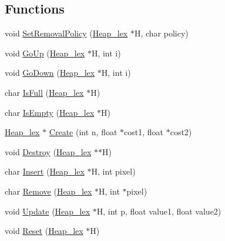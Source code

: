 \subsection*{Functions}
\begin{DoxyCompactItemize}
\item 
void \hyperlink{namespacegft_1_1Heap__lex_aae153f96da542040d4fdeef74b900c6b}{Set\-Removal\-Policy} (\hyperlink{namespacegft_1_1Heap__lex_ad75bb201b66a6623842b22d41ae1d473}{Heap\-\_\-lex} $\ast$H, char policy)
\item 
void \hyperlink{namespacegft_1_1Heap__lex_ad2299cff8030bb7a56ffa03d853bc97a}{Go\-Up} (\hyperlink{namespacegft_1_1Heap__lex_ad75bb201b66a6623842b22d41ae1d473}{Heap\-\_\-lex} $\ast$H, int i)
\item 
void \hyperlink{namespacegft_1_1Heap__lex_aaa798b34b2771a031ff24f8f8669f5a2}{Go\-Down} (\hyperlink{namespacegft_1_1Heap__lex_ad75bb201b66a6623842b22d41ae1d473}{Heap\-\_\-lex} $\ast$H, int i)
\item 
char \hyperlink{namespacegft_1_1Heap__lex_a48ce41964abae625a32874a58680912e}{Is\-Full} (\hyperlink{namespacegft_1_1Heap__lex_ad75bb201b66a6623842b22d41ae1d473}{Heap\-\_\-lex} $\ast$H)
\item 
char \hyperlink{namespacegft_1_1Heap__lex_a7a4b891ef87e1b4cefca5f79c5dee382}{Is\-Empty} (\hyperlink{namespacegft_1_1Heap__lex_ad75bb201b66a6623842b22d41ae1d473}{Heap\-\_\-lex} $\ast$H)
\item 
\hyperlink{namespacegft_1_1Heap__lex_ad75bb201b66a6623842b22d41ae1d473}{Heap\-\_\-lex} $\ast$ \hyperlink{namespacegft_1_1Heap__lex_a06993605587f76146bf34b535450ae84}{Create} (int n, float $\ast$cost1, float $\ast$cost2)
\item 
void \hyperlink{namespacegft_1_1Heap__lex_a3fad291724ba5fa77bf569ed317270e3}{Destroy} (\hyperlink{namespacegft_1_1Heap__lex_ad75bb201b66a6623842b22d41ae1d473}{Heap\-\_\-lex} $\ast$$\ast$H)
\item 
char \hyperlink{namespacegft_1_1Heap__lex_aa4ea2a2803590deaa210b3e882547a19}{Insert} (\hyperlink{namespacegft_1_1Heap__lex_ad75bb201b66a6623842b22d41ae1d473}{Heap\-\_\-lex} $\ast$H, int pixel)
\item 
char \hyperlink{namespacegft_1_1Heap__lex_a69f1e59d51b1fb0f8fa2023c12699df9}{Remove} (\hyperlink{namespacegft_1_1Heap__lex_ad75bb201b66a6623842b22d41ae1d473}{Heap\-\_\-lex} $\ast$H, int $\ast$pixel)
\item 
void \hyperlink{namespacegft_1_1Heap__lex_af604ad2f13e7f89a548b4b9694f0feb7}{Update} (\hyperlink{namespacegft_1_1Heap__lex_ad75bb201b66a6623842b22d41ae1d473}{Heap\-\_\-lex} $\ast$H, int p, float value1, float value2)
\item 
void \hyperlink{namespacegft_1_1Heap__lex_a8481062465946d16f1ebed2265312fdb}{Reset} (\hyperlink{namespacegft_1_1Heap__lex_ad75bb201b66a6623842b22d41ae1d473}{Heap\-\_\-lex} $\ast$H)
\end{DoxyCompactItemize}


